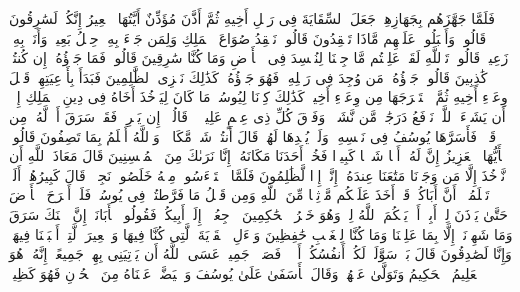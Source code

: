 \stopbuffer%
\startbuffer[\q:12:70]
فَلَمَّا جَهَّزَهُم بِجَهَازِهِمۡ جَعَلَ ٱلسِّقَایَةَ فِی رَحۡلِ أَخِیهِ ثُمَّ أَذَّنَ مُؤَذِّنٌ أَیَّتُهَا ٱلۡعِیرُ إِنَّكُمۡ لَسَٰرِقُونَ%
\stopbuffer%
\startbuffer[\q:12:71]
قَالُوا۟ وَأَقۡبَلُوا۟ عَلَیۡهِم مَّاذَا تَفۡقِدُونَ%
\stopbuffer%
\startbuffer[\q:12:72]
قَالُوا۟ نَفۡقِدُ صُوَاعَ ٱلۡمَلِكِ وَلِمَن جَاۤءَ بِهِۦ حِمۡلُ بَعِیرࣲ وَأَنَا۠ بِهِۦ زَعِیمࣱ%
\stopbuffer%
\startbuffer[\q:12:73]
قَالُوا۟ تَٱللَّهِ لَقَدۡ عَلِمۡتُم مَّا جِئۡنَا لِنُفۡسِدَ فِی ٱلۡأَرۡضِ وَمَا كُنَّا سَٰرِقِینَ%
\stopbuffer%
\startbuffer[\q:12:74]
قَالُوا۟ فَمَا جَزَٰۤؤُهُۥۤ إِن كُنتُمۡ كَٰذِبِینَ%
\stopbuffer%
\startbuffer[\q:12:75]
قَالُوا۟ جَزَٰۤؤُهُۥ مَن وُجِدَ فِی رَحۡلِهِۦ فَهُوَ جَزَٰۤؤُهُۥۚ كَذَٰلِكَ نَجۡزِی ٱلظَّٰلِمِینَ%
\stopbuffer%
\startbuffer[\q:12:76]
فَبَدَأَ بِأَوۡعِیَتِهِمۡ قَبۡلَ وِعَاۤءِ أَخِیهِ ثُمَّ ٱسۡتَخۡرَجَهَا مِن وِعَاۤءِ أَخِیهِۚ كَذَٰلِكَ كِدۡنَا لِیُوسُفَۖ مَا كَانَ لِیَأۡخُذَ أَخَاهُ فِی دِینِ ٱلۡمَلِكِ إِلَّاۤ أَن یَشَاۤءَ ٱللَّهُۚ نَرۡفَعُ دَرَجَٰتࣲ مَّن نَّشَاۤءُۗ وَفَوۡقَ كُلِّ ذِی عِلۡمٍ عَلِیمࣱ%
\stopbuffer%
\startbuffer[\q:12:77]
۞ قَالُوۤا۟ إِن یَسۡرِقۡ فَقَدۡ سَرَقَ أَخࣱ لَّهُۥ مِن قَبۡلُۚ فَأَسَرَّهَا یُوسُفُ فِی نَفۡسِهِۦ وَلَمۡ یُبۡدِهَا لَهُمۡۚ قَالَ أَنتُمۡ شَرࣱّ مَّكَانࣰاۖ وَٱللَّهُ أَعۡلَمُ بِمَا تَصِفُونَ%
\stopbuffer%
\startbuffer[\q:12:78]
قَالُوا۟ یَٰۤأَیُّهَا ٱلۡعَزِیزُ إِنَّ لَهُۥۤ أَبࣰا شَیۡخࣰا كَبِیرࣰا فَخُذۡ أَحَدَنَا مَكَانَهُۥۤۖ إِنَّا نَرَىٰكَ مِنَ ٱلۡمُحۡسِنِینَ%
\stopbuffer%
\startbuffer[\q:12:79]
قَالَ مَعَاذَ ٱللَّهِ أَن نَّأۡخُذَ إِلَّا مَن وَجَدۡنَا مَتَٰعَنَا عِندَهُۥۤ إِنَّاۤ إِذࣰا لَّظَٰلِمُونَ%
\stopbuffer%
\startbuffer[\q:12:80]
فَلَمَّا ٱسۡتَیۡءَسُوا۟ مِنۡهُ خَلَصُوا۟ نَجِیࣰّاۖ قَالَ كَبِیرُهُمۡ أَلَمۡ تَعۡلَمُوۤا۟ أَنَّ أَبَاكُمۡ قَدۡ أَخَذَ عَلَیۡكُم مَّوۡثِقࣰا مِّنَ ٱللَّهِ وَمِن قَبۡلُ مَا فَرَّطتُمۡ فِی یُوسُفَۖ فَلَنۡ أَبۡرَحَ ٱلۡأَرۡضَ حَتَّىٰ یَأۡذَنَ لِیۤ أَبِیۤ أَوۡ یَحۡكُمَ ٱللَّهُ لِیۖ وَهُوَ خَیۡرُ ٱلۡحَٰكِمِینَ%
\stopbuffer%
\startbuffer[\q:12:81]
ٱرۡجِعُوۤا۟ إِلَىٰۤ أَبِیكُمۡ فَقُولُوا۟ یَٰۤأَبَانَاۤ إِنَّ ٱبۡنَكَ سَرَقَ وَمَا شَهِدۡنَاۤ إِلَّا بِمَا عَلِمۡنَا وَمَا كُنَّا لِلۡغَیۡبِ حَٰفِظِینَ%
\stopbuffer%
\startbuffer[\q:12:82]
وَسۡءَلِ ٱلۡقَرۡیَةَ ٱلَّتِی كُنَّا فِیهَا وَٱلۡعِیرَ ٱلَّتِیۤ أَقۡبَلۡنَا فِیهَاۖ وَإِنَّا لَصَٰدِقُونَ%
\stopbuffer%
\startbuffer[\q:12:83]
قَالَ بَلۡ سَوَّلَتۡ لَكُمۡ أَنفُسُكُمۡ أَمۡرࣰاۖ فَصَبۡرࣱ جَمِیلٌۖ عَسَى ٱللَّهُ أَن یَأۡتِیَنِی بِهِمۡ جَمِیعًاۚ إِنَّهُۥ هُوَ ٱلۡعَلِیمُ ٱلۡحَكِیمُ%
\stopbuffer%
\startbuffer[\q:12:84]
وَتَوَلَّىٰ عَنۡهُمۡ وَقَالَ یَٰۤأَسَفَىٰ عَلَىٰ یُوسُفَ وَٱبۡیَضَّتۡ عَیۡنَاهُ مِنَ ٱلۡحُزۡنِ فَهُوَ كَظِیمࣱ%
